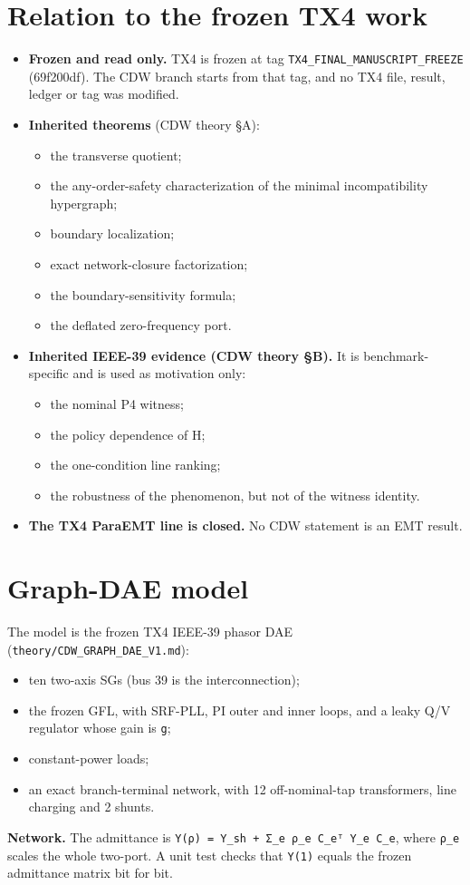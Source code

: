 \documentclass[10pt,a4paper]{article}
\begin{document}
\section{Relation to the frozen TX4 work}
\begin{itemize}
\item \textbf{Frozen and read only.} TX4 is frozen at tag \texttt{TX4\_\allowbreak{}FINAL\_\allowbreak{}MANUSCRIPT\_\allowbreak{}FREEZE} (69f200df). The CDW branch starts from that tag, and no TX4 file, result, ledger or tag was modified.
\item \textbf{Inherited theorems} (CDW theory §A):
\begin{itemize}
\item the transverse quotient;
\item the any-order-safety characterization of the minimal incompatibility hypergraph;
\item boundary localization;
\item exact network-closure factorization;
\item the boundary-sensitivity formula;
\item the deflated zero-frequency port.
\end{itemize}
\item \textbf{Inherited IEEE-39 evidence (CDW theory §B).} It is benchmark-specific and is used as motivation only:
\begin{itemize}
\item the nominal P4 witness;
\item the policy dependence of H;
\item the one-condition line ranking;
\item the robustness of the phenomenon, but not of the witness identity.
\end{itemize}
\item \textbf{The TX4 ParaEMT line is closed.} No CDW statement is an EMT result.
\end{itemize}
\section{Graph-DAE model}
The model is the frozen TX4 IEEE-39 phasor DAE (\texttt{theory/\allowbreak{}CDW\_\allowbreak{}GRAPH\_\allowbreak{}DAE\_\allowbreak{}V1.md}):

\begin{itemize}
\item ten two-axis SGs (bus 39 is the interconnection);
\item the frozen GFL, with SRF-PLL, PI outer and inner loops, and a leaky Q/V regulator whose gain is \texttt{g};
\item constant-power loads;
\item an exact branch-terminal network, with 12 off-nominal-tap transformers, line charging and 2 shunts.
\end{itemize}
\textbf{Network.} The admittance is \texttt{Y(ρ) =\allowbreak{} Y\_\allowbreak{}sh + Σ\_\allowbreak{}e ρ\_\allowbreak{}e C\_\allowbreak{}eᵀ Y\_\allowbreak{}e C\_\allowbreak{}e}, where \texttt{ρ\_\allowbreak{}e} scales the whole two-port. A unit test checks that \texttt{Y(1)} equals the frozen admittance matrix bit for bit.
\end{document}
